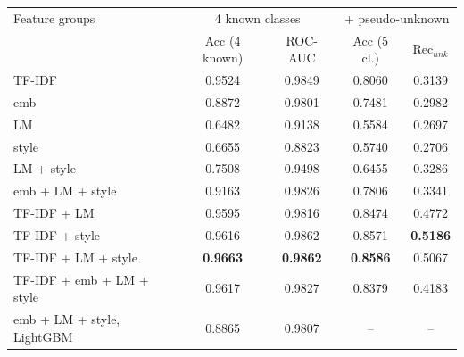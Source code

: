 \begin{tabular}{|l|cc|cc|}
\hline
Feature groups & \multicolumn{2}{c|}{4 known classes} & \multicolumn{2}{c|}{+ pseudo-unknown} \\
 & Acc (4 known) & ROC-AUC & Acc (5 cl.) & Rec$_{unk}$ \\
\hline
TF-IDF & 0.9524 & 0.9849 & 0.8060 & 0.3139 \\
emb & 0.8872 & 0.9801 & 0.7481 & 0.2982 \\
LM & 0.6482 & 0.9138 & 0.5584 & 0.2697 \\
style & 0.6655 & 0.8823 & 0.5740 & 0.2706 \\
LM + style & 0.7508 & 0.9498 & 0.6455 & 0.3286 \\
emb + LM + style & 0.9163 & 0.9826 & 0.7806 & 0.3341 \\
TF-IDF + LM & 0.9595 & 0.9816 & 0.8474 & 0.4772 \\
TF-IDF + style & 0.9616 & 0.9862 & 0.8571 & \textbf{0.5186} \\
TF-IDF + LM + style & \textbf{0.9663} & \textbf{0.9862} & \textbf{0.8586} & 0.5067 \\
TF-IDF + emb + LM + style & 0.9617 & 0.9827 & 0.8379 & 0.4183 \\
emb + LM + style, LightGBM & 0.8865 & 0.9807 & -- & -- \\
\hline
\end{tabular}

